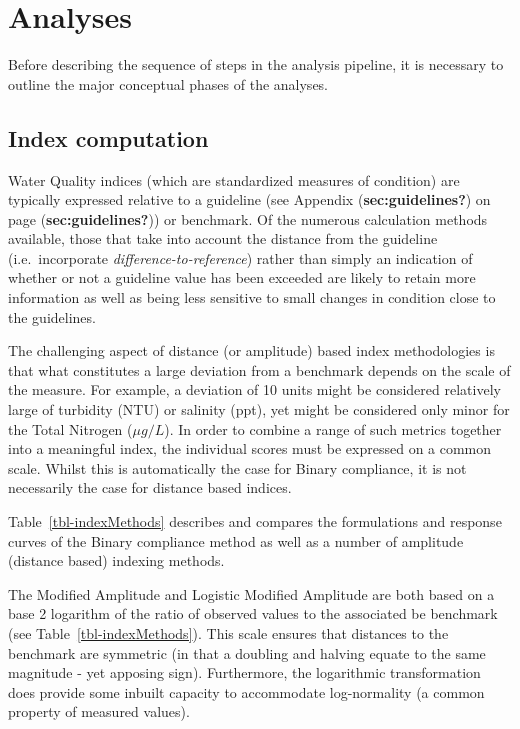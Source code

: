 \documentclass[
  8pt,
  a4paper]{article}
\begin{document}
\section{Analyses}\label{analyses}

Before describing the sequence of steps in the analysis pipeline, it is
necessary to outline the major conceptual phases of the analyses.

\subsection{Index computation}\label{sec-index-computation}

Water Quality indices (which are standardized measures of condition) are
typically expressed relative to a guideline (see Appendix
(\textbf{sec:guidelines?}) on page (\textbf{sec:guidelines?})) or
benchmark. Of the numerous calculation methods available, those that
take into account the distance from the guideline (i.e.~incorporate
\emph{difference-to-reference}) rather than simply an indication of
whether or not a guideline value has been exceeded are likely to retain
more information as well as being less sensitive to small changes in
condition close to the guidelines.

The challenging aspect of distance (or amplitude) based index
methodologies is that what constitutes a large deviation from a
benchmark depends on the scale of the measure. For example, a deviation
of 10 units might be considered relatively large of turbidity (NTU) or
salinity (ppt), yet might be considered only minor for the Total
Nitrogen (\(\mu g/L\)). In order to combine a range of such metrics
together into a meaningful index, the individual scores must be
expressed on a common scale. Whilst this is automatically the case for
Binary compliance, it is not necessarily the case for distance based
indices.

Table~\ref{tbl-indexMethods} describes and compares the formulations and
response curves of the Binary compliance method as well as a number of
amplitude (distance based) indexing methods.

The Modified Amplitude and Logistic Modified Amplitude are both based on
a base 2 logarithm of the ratio of observed values to the associated be
benchmark (see Table~\ref{tbl-indexMethods}). This scale ensures that
distances to the benchmark are symmetric (in that a doubling and halving
equate to the same magnitude - yet apposing sign). Furthermore, the
logarithmic transformation does provide some inbuilt capacity to
accommodate log-normality (a common property of measured values).
\end{document}
